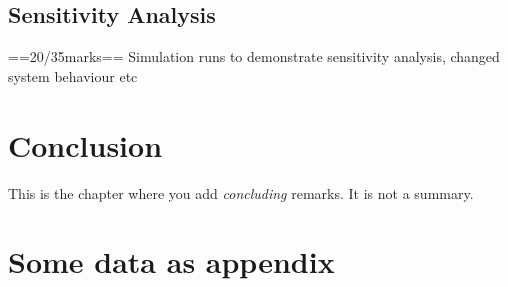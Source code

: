 \documentclass[a4paper,11pt,fleqn]{report}
\begin{document}
\section{Sensitivity Analysis}
==20/35marks==
Simulation runs to demonstrate sensitivity analysis, changed system behaviour etc 

\chapter{Conclusion}
\acresetall
This is the chapter where you add \emph{concluding} remarks. It is not a summary.



\appendix
\chapter{Some data as appendix}
\end{document}

